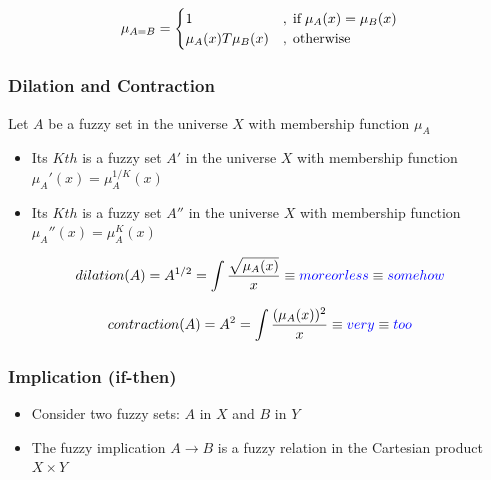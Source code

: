 \documentclass{tron}
\newcommand{\squeezeup}{\vspace{-2.5 mm}}
\begin{document}
\begin{equation}
	\mu_{A=B} = \begin{cases}
 		1 \quad 			& ,\;\text{if}\; \mu_A(x) = \mu_B(x) \\
 		\mu_A(x) T \mu_B(x) & ,\;\text{otherwise}  
 	\end{cases}
\end{equation}


\subsubsection{Dilation and Contraction}
Let $A$ be a fuzzy set in the universe $X$ with membership function $\mu_A$
\squeezeup
\begin{itemize}
	\item Its $Kth$  is a fuzzy set $A'$ in the universe $X$ with membership function $\mu_A' (x) = \mu_A^{1/K} (x)$
	\item Its $Kth$  is a fuzzy set $A''$ in the universe $X$ with membership function $\mu_A'' (x) = \mu_A^{K} (x)$
\end{itemize}

\begin{equation}
	dilation(A) = A^{1/2} = \int \frac{\sqrt{\mu_A(x)}}{x} \equiv \textcolor{blue}{more or less} \equiv \textcolor{blue}{somehow}
\end{equation}

\begin{equation}
	contraction(A) = A^{2} = \int \frac{(\mu_A(x))^2}{x} \equiv \textcolor{blue}{very} \equiv \textcolor{blue}{too}
\end{equation}


\subsubsection{Implication (if-then)}
\begin{itemize}
	\item Consider two fuzzy sets: $A$ in $X$ and $B$ in $Y$
	\item The fuzzy implication $A\rightarrow B$ is a fuzzy relation in the Cartesian product $X \times Y$ 
\end{itemize}
\end{document}
